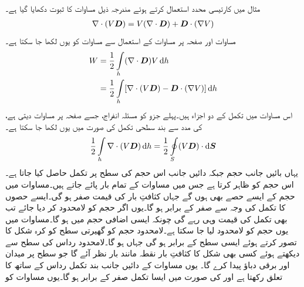 مثال  میں کارتیسی محدد استعمال کرتے ہوئے مندرجہ ذیل مساوات کا ثبوت دکھایا گیا ہے۔
\begin{align}\label{مساوات_توانائی_توانائی_ضرب_برقی_بہاو_کی_ڈھلوان}
\nabla \cdot  (V {{\boldsymbol{D}}})=V (\nabla \cdot {\ensuremath{{\boldsymbol{D}}}})+{{\boldsymbol{D}}} \cdot (\nabla V)
\end{align}
مساوات  اور  صفحہ  پر مساوات  کے استعمال سے مساوات  کو یوں لکھا جا سکتا ہے۔
\begin{gather}
\begin{aligned}\label{مساوات_توانائی_کا_تکمل}
W&=\frac{1}{2}\int\limits_h (\nabla \cdot \kvec{D} )V \dif h\\
&=\frac{1}{2} \int \limits_h [\nabla \cdot (V \kvec{D})-\kvec{D} \cdot (\nabla V)] \dif h
\end{aligned}
\end{gather}
اس مساوات میں تکمل کے دو اجزاء ہیں۔پہلے جزو کو مسئلہ انفراج، جسے صفحہ  پر مساوات   دیتی ہے، کی مدد سے بند سطحی تکمل کی صورت میں یوں لکھا جا سکتا ہے۔
\begin{align}\label{مساوات_توانائی_لامحدود_سطح_بند_تکمل_صفر}
\frac{1}{2}\int\limits_h \nabla \cdot (V \kvec{D}) \dif h = \frac{1}{2}\oint \limits_S (V \kvec{D}) \cdot \dif \kvec{S}
\end{align} 
یہاں بائیں جانب حجم  جبکہ دائیں جانب اس حجم کی سطح  پر تکمل حاصل کیا جاتا ہے۔ اس حجم کو ظاہر کرتا ہے جس میں مساوات  کے تمام بار پائے جاتے ہیں۔مساوات  میں حجم کے ایسے حصے بھی ہوں گے جہاں کثافتِ بار  کی قیمت صفر ہو گی۔ایسے حصوں کا تکمل  کی وجہ سے صفر کے برابر ہو گا۔یوں اگر حجم کو لامحدود کر دیا جائے تب بھی تکمل کی قیمت وہی رہے گی چونکہ ایسی اضافی حجم میں   ہو گا۔مساوات  میں یوں حجم کو لامحدود لیا جا سکتا ہے۔لامحدود حجم کو گھیرتی سطح کو کرہ شکل کا تصور کرتے ہوئے ایسی سطح  کے برابر ہو گی جہاں  ہو گا۔لامحدود رداس کی سطح سے دیکھتے ہوئے کسی بھی شکل کا کثافتِ بار نقطہ مانند بار  نظر آئے گا جو سطح پر  میدان اور  برقی دباؤ پیدا کرے گا۔ یوں مساوات   کے دائیں جانب بند تکمل رداس کے ساتھ  کا تعلق رکھتا ہے اور  کی صورت میں ایسا تکمل صفر کے برابر ہو گا۔یوں  مساوات  کو
